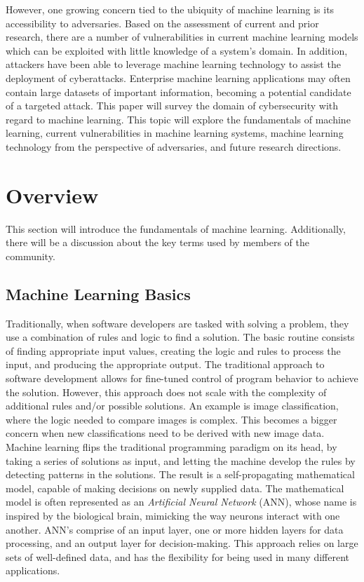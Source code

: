 \documentclass[11pt,conference]{IEEEtran}
\begin{document}
However, one growing concern tied to the ubiquity of machine learning is its 
accessibility to adversaries. Based on the assessment of current and prior
research, there are a number of vulnerabilities in current machine learning
models which can be exploited with little knowledge of a system's domain. In
addition, attackers have been able to leverage machine learning technology to
assist the deployment of cyberattacks. Enterprise machine learning applications
may often contain large datasets of important information, becoming a potential 
candidate of a targeted attack. This paper will survey the domain of
cybersecurity with regard to machine learning. This topic will explore the
fundamentals of machine learning, current vulnerabilities in machine learning
systems, machine learning technology from the perspective of adversaries, and
future research directions.

\section{Overview}
This section will introduce the fundamentals of machine learning. Additionally,
there will be a discussion about the key terms used by members of the community.

\subsection{Machine Learning Basics}
Traditionally, when software developers are tasked with solving a problem, they
use a combination of rules and logic to find a solution. The basic
routine consists of finding appropriate input values,
creating the logic and rules to process the input, and producing the appropriate output.
The traditional approach to software development allows for fine-tuned control
of program behavior to achieve the solution. However, this approach does not scale
with the complexity of additional rules and/or possible solutions. An
example is image classification, where the logic needed to compare images
is complex. This becomes a bigger concern when new classifications need to be
derived with new image data. Machine learning flips the traditional programming
paradigm on its head, by taking a series of solutions as input, and
letting the machine develop the rules by detecting patterns in the solutions.
The result is a self-propagating mathematical model, capable of making
decisions on newly supplied data. The mathematical model is often represented
as an \emph{Artificial Neural Network} (ANN), whose name is inspired by the
biological brain, mimicking the way neurons interact with one another. ANN's comprise of an input layer, one
or more hidden layers for data processing, and an output layer for
decision-making. This approach relies on large sets of
well-defined data, and has the flexibility for being used in many different applications.
\end{document}
